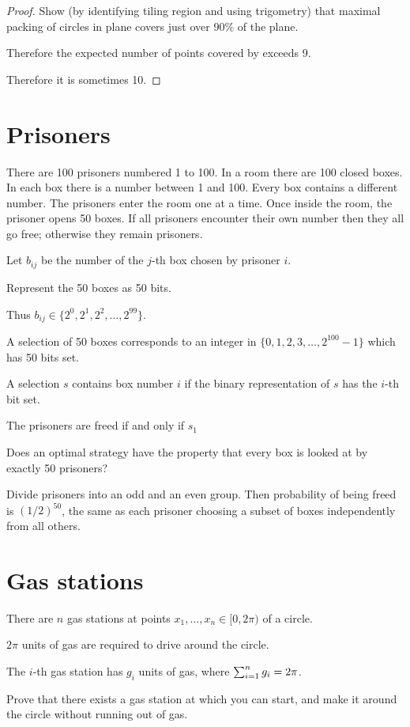\documentclass[12pt]{article}
\begin{document}
\begin{proof}
  Show (by identifying tiling region and using trigometry) that maximal packing of circles in plane
  covers just over $90\%$ of the plane.

  Therefore the expected number of points covered by exceeds 9.

  Therefore it is sometimes 10.
\end{proof}

\newpage
\section{Prisoners}
\begin{mdframed}
  There are 100 prisoners numbered 1 to 100. In a room there are 100 closed boxes. In each box
  there is a number between 1 and 100. Every box contains a different number. The prisoners enter
  the room one at a time. Once inside the room, the prisoner opens 50 boxes. If all prisoners
  encounter their own number then they all go free; otherwise they remain prisoners.
\end{mdframed}

Let $b_{ij}$ be the number of the $j$-th box chosen by prisoner $i$.

Represent the 50 boxes as 50 bits.

Thus $b_{ij} \in \{2^0, 2^1, 2^2, \ldots, 2^{99}\}$.

A selection of 50 boxes corresponds to an integer in $\{0, 1, 2, 3, \ldots, 2^{100} - 1\}$ which
has 50 bits set.

A selection $s$ contains box number $i$ if the binary representation of $s$ has the $i$-th bit set.

The prisoners are freed if and only if $s_1$

Does an optimal strategy have the property that every box is looked at by exactly 50 prisoners?

Divide prisoners into an odd and an even group. Then probability of being freed is $(1/2)^{50}$,
the same as each prisoner choosing a subset of boxes independently from all others.

\newpage
\section{Gas stations}

\begin{mdframed}
  There are $n$ gas stations at points $x_1, \ldots, x_n \in [0, 2\pi)$ of a circle.

  $2\pi$ units of gas are required to drive around the circle.

  The $i$-th gas station has $g_i$ units of gas, where $\sum_{i=1}^{n} g_i = 2\pi$.

  Prove that there exists a gas station at which you can start, and make it around the circle
  without running out of gas.
\end{mdframed}
\end{document}
